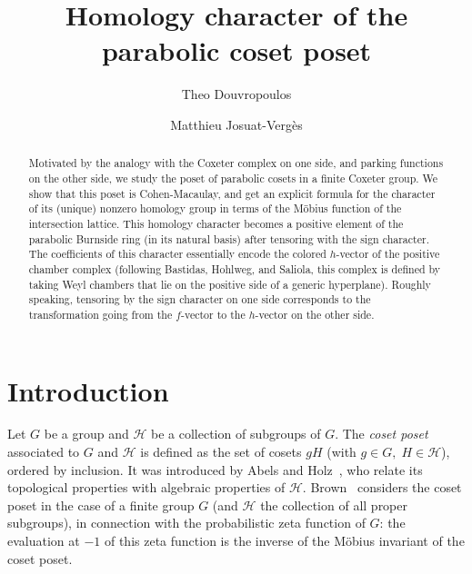 \documentclass[11pt]{article}
\title{Homology character of the parabolic coset poset}
\author[1]{Theo Douvropoulos}
\author[2]{Matthieu Josuat-Vergès}
\affil[1]{Brandeis University}
\affil[2]{IRIF, CNRS, Université Paris-Cité}
\date{}
\theoremstyle{definition}
\begin{document}
\maketitle

\begin{abstract}
    Motivated by the analogy with the Coxeter complex on one side, and parking functions on the other side, we study the poset of parabolic cosets in a finite Coxeter group.  We show that this poset is Cohen-Macaulay, and get an explicit formula for the character of its (unique) nonzero homology group in terms of the Möbius function of the intersection lattice.  This homology character becomes a positive element of the parabolic Burnside ring (in its natural basis) after tensoring with the sign character.  The coefficients of this character essentially encode the colored $h$-vector of the positive chamber complex (following Bastidas, Hohlweg, and Saliola, this complex is defined by taking Weyl chambers that lie on the positive side of a generic hyperplane).  Roughly speaking, tensoring by the sign character on one side corresponds to the transformation going from the $f$-vector to the $h$-vector on the other side.
\end{abstract}


\section{Introduction}

Let $G$ be a group and $\mathcal{H}$ be a collection of subgroups of $G$.  The {\it  coset poset} associated to $G$ and $\mathcal{H}$ is defined as the set of cosets $gH$ (with $g\in G, \; H\in \mathcal{H}$), ordered by inclusion.  It was introduced by Abels and Holz~\cite{abelsholz}, who relate its topological properties with algebraic properties of $\mathcal{H}$.  Brown~\cite{brown} considers the coset poset in the case of a finite group $G$ (and $\mathcal{H}$ the collection of all proper subgroups), in connection with the probabilistic zeta function of $G$: the evaluation at $-1$ of this zeta function is the inverse of  the Möbius invariant of the coset poset.
\end{document}
